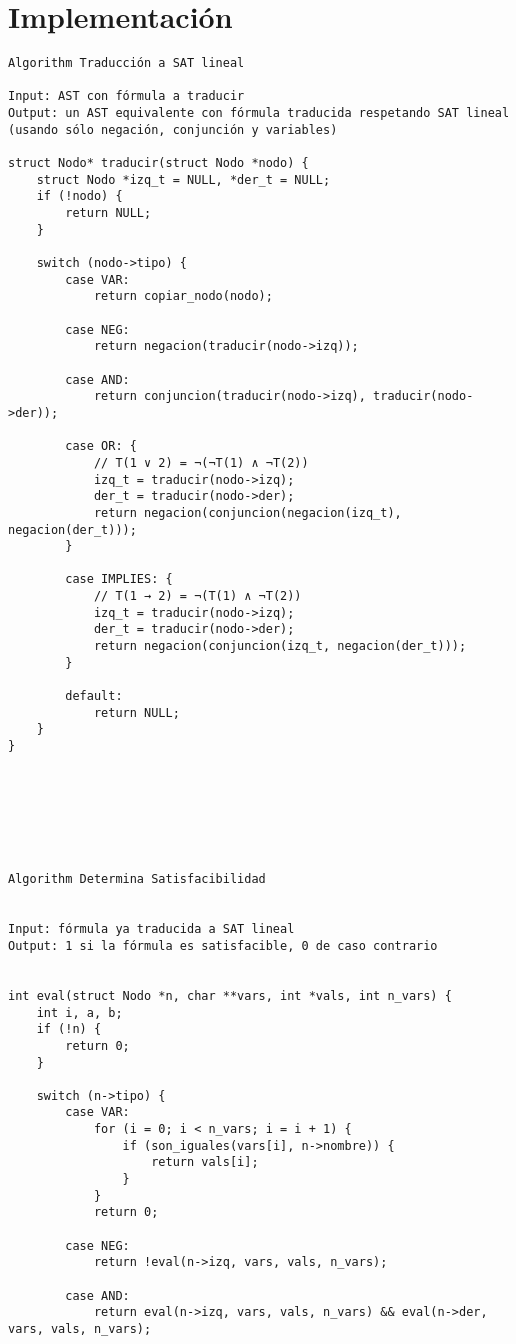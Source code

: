 \documentclass{article}
\begin{document}
%
\newpage
\section{Implementaci\'on}
\begin{verbatim}
Algorithm Traducción a SAT lineal

Input: AST con fórmula a traducir 
Output: un AST equivalente con fórmula traducida respetando SAT lineal 
(usando sólo negación, conjunción y variables)

struct Nodo* traducir(struct Nodo *nodo) {
    struct Nodo *izq_t = NULL, *der_t = NULL;
    if (!nodo) {
        return NULL;
    }

    switch (nodo->tipo) {
        case VAR:
            return copiar_nodo(nodo);

        case NEG:
            return negacion(traducir(nodo->izq));

        case AND:
            return conjuncion(traducir(nodo->izq), traducir(nodo->der));

        case OR: {
            // T(1 ∨ 2) = ¬(¬T(1) ∧ ¬T(2))
            izq_t = traducir(nodo->izq);
            der_t = traducir(nodo->der);
            return negacion(conjuncion(negacion(izq_t), negacion(der_t)));
        }

        case IMPLIES: {
            // T(1 → 2) = ¬(T(1) ∧ ¬T(2))
            izq_t = traducir(nodo->izq);
            der_t = traducir(nodo->der);
            return negacion(conjuncion(izq_t, negacion(der_t)));
        }

        default:
            return NULL;
    }
}







Algorithm Determina Satisfacibilidad


Input: fórmula ya traducida a SAT lineal
Output: 1 si la fórmula es satisfacible, 0 de caso contrario


int eval(struct Nodo *n, char **vars, int *vals, int n_vars) {
    int i, a, b;
    if (!n) {
        return 0;
    }

    switch (n->tipo) {
        case VAR:
            for (i = 0; i < n_vars; i = i + 1) {
                if (son_iguales(vars[i], n->nombre)) {
                    return vals[i];
                }
            }
            return 0;

        case NEG:
            return !eval(n->izq, vars, vals, n_vars);

        case AND:
            return eval(n->izq, vars, vals, n_vars) && eval(n->der, vars, vals, n_vars);


\end{verbatim}
\end{document}
